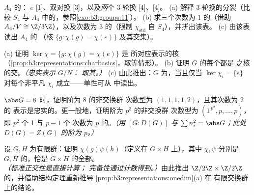 \begin{exercise}[$\star\star$]\label{exo:b3:representations:5}
$A_4$ 的： $e$ [1]、双对换
[3]，以及\emph{两}个 $3$-轮换 [4]、[4]。
(a) 解释 $3$-轮换的分裂（比较
$S_4$ 与 $A_4$ 中的，参照\cref{exo:b3:groups:11}）。
(b) 求三个次数为 $1$ 的（借助 $A_4/V \cong
\Z/3\Z$），以及次数为 $3$ 的（限制
$\chi_{\mathrm{std}}$ 自 $S_4$），并拼出该表。
(c) 由该表读出 $A_4$ 的
（核 $\{g : \chi(g) = \chi(e)\}$ 及其交集）。
\end{exercise}

\begin{exercise}[$\star\star$]\label{exo:b3:representations:6}
(a) 证明 $\ker\chi = \{g : \chi(g) = \chi(e)\}$ 是
所对应表示的核
（\cref{prop:b3:representations:charbasics}，取等情形）。
(b) 证明 $G$ 的每个都是
之核的交。\emph{（忠实表示 $G/N$：
取其。）}
(c) 由此推出：$G$ 为，当且仅当 $\ker\chi_i = \{e\}$
对每个非平凡 $\chi_i$ 成立——单性可从
中读出。
\end{exercise}

\begin{exercise}[$\star\star$]\label{exo:b3:representations:7}
$\abs G = 8$ 时，证明阶为 $8$ 的非交换群
次数型为 $(1,1,1,1,2)$，且其次数为 $2$ 的
表示是忠实的。更一般地，证明阶为 $p^3$ 的非交换群
次数型为 $(1^{\,p^2},
p, \dots, p)$，即 $p^2$ 个 1 与 $p - 1$ 个
次数为 $p$ 的。\emph{（用 $[G : D(G)]$ 与 $\sum n_i^2 = \abs G$；此处
$D(G) = Z(G)$ 的阶为 $p$。）}
\end{exercise}

\begin{exercise}[$\star\star\star$]\label{exo:b3:representations:8}
设 $G, H$ 为有限群：证明
 $\chi(g)\psi(h)$（定义在 $G \times H$ 上），其中 $\chi, \psi$
分别是 $G, H$ 的，恰是
$G \times H$ 的全部。\emph{（标准正交性是直接计算；
完备性通过计数得到。）}由此推出
$\Z/2\Z \times \Z/2\Z$ 的，并借助结构定理重新推导
\cref{prop:b3:representations:onedim}(a) 在
有限交换群上的结论。
\end{exercise}

